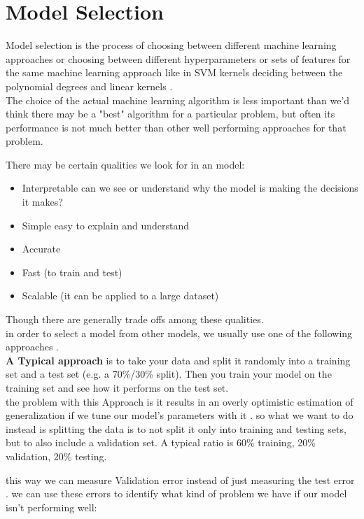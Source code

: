 \section{Model Selection } \label{ms}
Model selection is the process of choosing between different machine learning approaches  or choosing between different hyperparameters or sets of features for the same machine learning approach  like in SVM kernels deciding between the polynomial degrees and  linear kernels .\\
The choice of the actual machine learning algorithm is less important than we'd think  there may be a "best" algorithm for a particular problem, but often its performance is not much better than other well performing approaches for that problem.

There may be certain qualities we look for in an model:

\begin{itemize}
\item Interpretable   can we see or understand why the model is making the decisions it makes?
\item Simple   easy to explain and understand
\item Accurate
\item Fast (to train and test)
\item Scalable (it can be applied to a large dataset)

\end{itemize}
Though there are generally trade offs among these qualities.\\in order to select a model from other models, we usually use one of the following approaches  .\\\textbf{A Typical approach } is to take your data and split it randomly into a training set and a test set (e.g. a 70\%/30\% split). Then you train your model on the training set and see how it performs on the test set.\\the problem with this Approach is it results in an overly optimistic estimation of generalization if we tune our model's parameters with it . so what we want to do instead is splitting the data is to not split it only into training and testing sets, but to also include a validation set. A typical ratio is 60\% training, 20\% validation, 20\% testing.

this way we can measure Validation error instead of just measuring the test error .
we can use these errors   to identify what kind of problem we have if our model isn't performing well:

